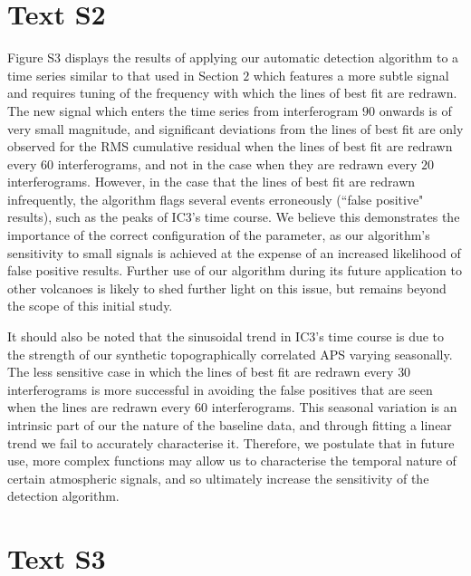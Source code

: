 \section*{Text S2}

Figure S3  displays the results of applying our automatic detection algorithm to a time series similar to that used in Section $2$ which features a more subtle signal and requires tuning of the frequency with which the lines of best fit are redrawn.  The new signal which enters the time series from interferogram $90$ onwards is of very small magnitude, and significant deviations from the lines of best fit are only observed for the RMS cumulative residual when the lines of best fit are redrawn every $60$ interferograms, and not in the case when they are redrawn every $20$ interferograms.  However, in the case that the lines of best fit are redrawn infrequently, the algorithm flags several events erroneously (``false positive" results), such as the peaks of IC3's time course.  We believe this demonstrates the importance of the correct configuration of the parameter, as our algorithm's sensitivity to small signals is achieved at the expense of an increased likelihood of false positive results.  Further use of our algorithm during its future application to other volcanoes is likely to shed further light on this issue, but remains beyond the scope of this initial study.  

It should also be noted that the sinusoidal trend in IC3's time course is due to the strength of our synthetic topographically correlated APS varying seasonally.  The less sensitive case in which the lines of best fit are redrawn every $30$ interferograms is more successful in avoiding the false positives that are seen when the lines are redrawn every $60$ interferograms.  This seasonal variation is an intrinsic part of our the nature of the baseline data, and through fitting a linear trend we fail to accurately characterise it.  Therefore, we postulate that in future use, more complex functions may allow us to characterise the temporal nature of certain atmospheric signals, and so ultimately increase the sensitivity of the detection algorithm.  

\section*{Text S3}

